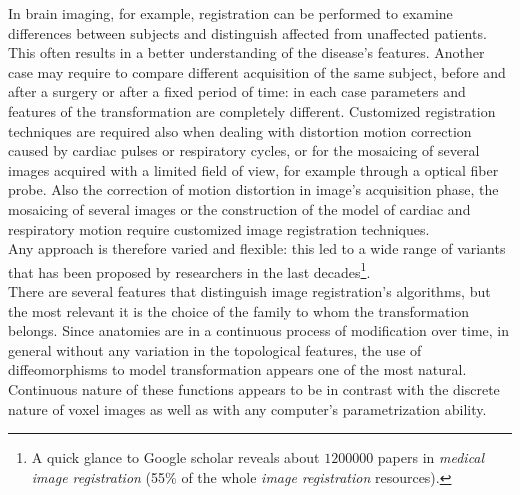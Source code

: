 %
%
%
%
In brain imaging, for example, registration can be performed to examine differences between subjects and distinguish affected from unaffected patients. This often results in a better understanding of the disease's features. Another case may require to compare different acquisition of the same subject, before and after a surgery or after a fixed period of time: in each case parameters and features of the transformation are completely different.
Customized registration techniques are required also when dealing with distortion motion correction caused by cardiac pulses or respiratory cycles, or for the mosaicing of several images acquired with a limited field of view, for example through a optical fiber probe.
Also the correction of motion distortion in image's acquisition phase, the mosaicing of several images or the construction of the model of cardiac and respiratory motion require customized image registration techniques.\\
Any approach is therefore varied and flexible: this led to a wide range of variants that has been proposed by researchers in the last decades\footnote{A quick glance to Google scholar reveals about $1200000$ papers in \emph{medical image registration} (55\% of the whole \emph{image registration} resources).}.\\
There are several features that distinguish image registration's algorithms, but the most relevant it is the choice of the family to whom the transformation belongs. Since anatomies are in a continuous process of modification over time, in general without any variation in the topological features, the use of diffeomorphisms to model transformation appears one of the most natural.\\
Continuous nature of these functions appears to be in contrast with the discrete nature of voxel images as well as with any computer's parametrization ability.\\
